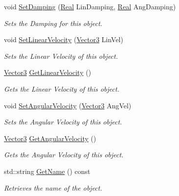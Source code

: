 \begin{DoxyCompactItemize}
void \hyperlink{classphys_1_1ActorRigid_a228fc92e7db56d07e441e6812ac28288}{SetDamping} (\hyperlink{namespacephys_af7eb897198d265b8e868f45240230d5f}{Real} LinDamping, \hyperlink{namespacephys_af7eb897198d265b8e868f45240230d5f}{Real} AngDamping)
\begin{DoxyCompactList}\small\item\em Sets the Damping for this object. \item\end{DoxyCompactList}\item 
void \hyperlink{classphys_1_1ActorRigid_a2b25eed4dcd594796c35a549d1c87559}{SetLinearVelocity} (\hyperlink{classphys_1_1Vector3}{Vector3} LinVel)
\begin{DoxyCompactList}\small\item\em Sets the Linear Velocity of this object. \item\end{DoxyCompactList}\item 
\hyperlink{classphys_1_1Vector3}{Vector3} \hyperlink{classphys_1_1ActorRigid_add50c9f86048470de3e04e0de1e0e498}{GetLinearVelocity} ()
\begin{DoxyCompactList}\small\item\em Gets the Linear Velocity of this object. \item\end{DoxyCompactList}\item 
void \hyperlink{classphys_1_1ActorRigid_a00ae9cd063f7f879d6bee15c807101d2}{SetAngularVelocity} (\hyperlink{classphys_1_1Vector3}{Vector3} AngVel)
\begin{DoxyCompactList}\small\item\em Sets the Angular Velocity of this object. \item\end{DoxyCompactList}\item 
\hyperlink{classphys_1_1Vector3}{Vector3} \hyperlink{classphys_1_1ActorRigid_a54393bf3756324875497960bd9215b2e}{GetAngularVelocity} ()
\begin{DoxyCompactList}\small\item\em Gets the Angular Velocity of this object. \item\end{DoxyCompactList}\item 
std::string \hyperlink{classphys_1_1ActorRigid_a63952e0b7ab7176ae60d96756dd84b43}{GetName} () const 
\begin{DoxyCompactList}\small\item\em Retrieves the name of the object. \item\end{DoxyCompactList}\item 

\end{DoxyCompactItemize}
